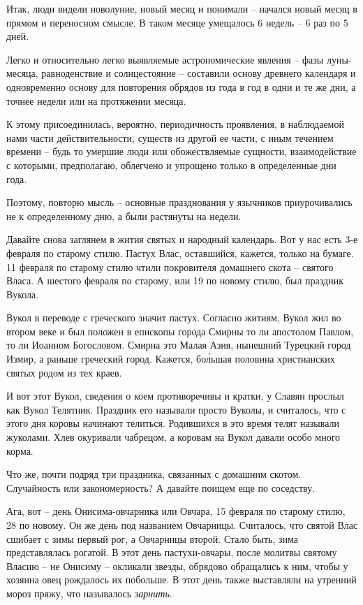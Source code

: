 \documentclass[a5paper,11pt,openany]{article}
\begin{document}
   Итак, люди видели новолуние, новый месяц и понимали – начался новый месяц в прямом и переносном смысле. В таком месяце умещалось 6 недель – 6 раз по 5 дней.

   Легко и относительно легко выявляемые астрономические явления – фазы луны-месяца, равноденствие и солнцестояние –  составили основу древнего календаря и одновременно основу для повторения обрядов из года в год в одни и те же дни, а точнее недели или на протяжении месяца.

   К этому присоединилась, вероятно, периодичность проявления, в наблюдаемой нами части действительности, существ из другой ее части, с иным течением времени – будь то умершие люди или обожествляемые сущности, взаимодействие с которыми, предполагаю, облегчено и упрощено только в определенные дни года.

  Поэтому, повторю мысль – основные празднования у язычников приурочивались не к определенному дню, а были растянуты на недели.

   Давайте снова заглянем в жития святых и народный календарь. Вот у нас есть 3-е февраля по старому стилю. Пастух Влас, оставшийся, кажется, только на бумаге. 11 февраля по старому стилю чтили покровителя домашнего скота – святого Власа. А шестого февраля по старому, или 19 по новому стилю, был праздник Вукола.

   Вукол в переводе с греческого значит пастух. Согласно житиям, Вукол жил во втором веке и был положен в епископы города Смирны то ли апостолом Павлом, то ли Иоанном Богословом. Смирна это Малая Азия, нынешний Турецкий город Измир, а раньше греческий город. Кажется, бо\'льшая половина христианских святых родом из тех краев.

   И вот этот Вукол, сведения о коем противоречивы и кратки, у Славян прослыл как Вукол Телятник. Праздник его называли просто Вуколы, и считалось, что с этого дня коровы начинают телиться. Родившихся в это время телят называли жуколами. Хлев окуривали чабрецом, а коровам на Вукол давали особо много корма.

  Что же, почти подряд три праздника, связанных с домашним скотом. Случайность или закономерность? А давайте поищем еще по соседству.

  Ага, вот – день Онисима-овчарника или Овчара, 15 февраля по старому стилю, 28 по новому. Он же день под названием Овчарницы. Считалось, что святой Влас сшибает с зимы первый рог, а Овчарницы второй. Стало быть, зима представлялась рогатой. В этот день пастухи-овчары, после молитвы святому Власию – не Онисиму – окликали звезды, обрядово обращались к ним, чтобы у хозяина овец рождалось их побольше. В этот день также выставляли на утренний мороз пряжу, что называлось \textit{ зарнить}.
\end{document}
